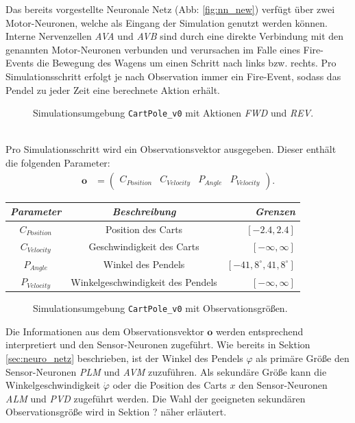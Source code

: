 	Das bereits vorgestellte Neuronale Netz (Abb: \ref{fig:nn_new}) verfügt über zwei Motor-Neuronen, welche als Eingang der Simulation genutzt werden können. Interne Nervenzellen \textit{AVA} und \textit{AVB} sind durch eine direkte Verbindung mit den genannten Motor-Neuronen verbunden und verursachen im Falle eines Fire-Events die Bewegung des Wagens um einen Schritt nach links bzw. rechts. Pro Simulationsschritt erfolgt je nach Observation immer ein Fire-Event, sodass das Pendel zu jeder Zeit eine berechnete Aktion erhält.
	\begin{figure}[!h] %
		\centering
		\def\svgwidth{12cm}
		
		\caption{Simulationsumgebung \texttt{CartPole\_v0} mit Aktionen \textit{FWD} und \textit{REV}.}
		\label{fig:imp_cartpole_FWD_REV}
	\end{figure}\\
	Pro Simulationsschritt wird ein Observationsvektor ausgegeben. Dieser enthält die folgenden Parameter:
	\begin{align}
		\boldsymbol{o} &= \begin{pmatrix}C_{Position} & C_{Velocity} & P_{Angle} & P_{Velocity}\end{pmatrix}\text{.}
	\end{align}
	\begin{center}
		\begin{tabular}{c@{\hskip 0.5cm}c@{\hskip 0.5cm}r@{\hskip 0.5cm}}    \toprule
			\setlength{\tabcolsep}{50pt}
			\renewcommand{\arraystretch}{1.5}
			\emph{Parameter}	& \emph{Beschreibung}  				& \emph{Grenzen} 			\\\midrule
			$C_{Position}$		& Position des Carts				& $[-2.4, 2.4]$				\\
			$C_{Velocity}$		& Geschwindigkeit des Carts			& $[-\infty, \infty]$		\\
			$P_{Angle}$			& Winkel des Pendels				& $[-41,8^{\circ}, 41,8^{\circ}]$	\\
			$P_{Velocity}$		& Winkelgeschwindigkeit des Pendels	& $[-\infty, \infty]$		\\\bottomrule
			\hline
		\end{tabular}
	\end{center}
	\begin{figure}[!h] %
		\centering
		\def\svgwidth{12cm}
		
		\caption{Simulationsumgebung \texttt{CartPole\_v0} mit Observationsgrößen.}
		\label{fig:imp_cartpole_observation}
	\end{figure}
	Die Informationen aus dem Observationsvektor $\boldsymbol{o}$ werden entsprechend interpretiert und den Sensor-Neuronen zugeführt. Wie bereits in Sektion \ref{sec:neuro_netz} beschrieben, ist der Winkel des Pendels $\varphi$ als primäre Größe den Sensor-Neuronen \textit{PLM} und \textit{AVM} zuzuführen. Als sekundäre Größe kann die Winkelgeschwindigkeit $\dot{\varphi}$ oder die Position des Carts $x$ den Sensor-Neuronen \textit{ALM} und \textit{PVD} zugeführt werden. Die Wahl der geeigneten sekundären Observationsgröße wird in Sektion ? näher erläutert.

